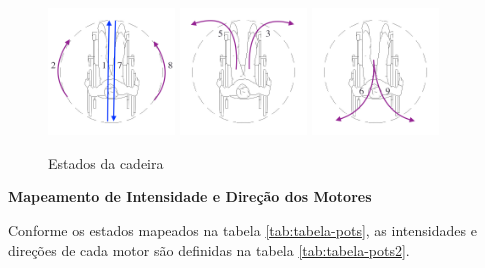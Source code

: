 		\begin{figure}[!ht]
			\center
			\includegraphics[width=0.3\textwidth]{figuras/resultados/estados_1_2_7_8}
			\includegraphics[width=0.3\textwidth]{figuras/resultados/estados_3_5}
			\includegraphics[width=0.3\textwidth]{figuras/resultados/estados_6_9}
			\caption{Estados da cadeira}
			\label{fig:estados}
		\end{figure}

		\textbf{Mapeamento de Intensidade e Direção dos Motores}

		Conforme os estados mapeados na tabela \ref{tab:tabela-pots}, as intensidades e direções de cada motor são definidas na tabela \ref{tab:tabela-pots2}.


